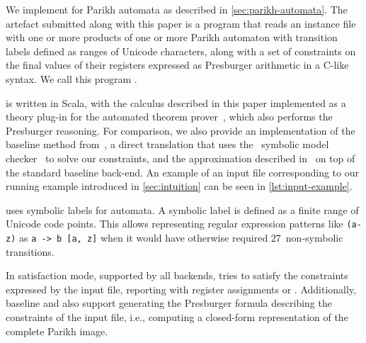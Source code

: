 
We implement \Calculus{} for Parikh automata as described in
\cref{sec:parikh-automata}. The artefact submitted along with this paper is a
program that reads an instance file with one or more products of one or more
Parikh automaton with transition labels defined as ranges of Unicode characters,
along with a set of constraints on the final values of their registers expressed
as Presburger arithmetic in a C-like syntax. We call this program
\Catra.

\Catra{} is written in Scala, with the calculus described in this paper
implemented as a theory plug-in for the \Princess{} automated theorem
prover~\cite{princess}, which also performs the Presburger reasoning. For
comparison, we also provide an implementation of the baseline method
from~\cite{generate-parikh-image}, a direct translation that uses the~\Nuxmv{}
symbolic model checker~\cite{nuxmv} to solve our constraints, and the
approximation described in~\cite{approximate-parikh} on top of the standard
baseline back-end. An example of an input file corresponding to our running
example introduced in \cref{sec:intuition} can be seen in
\cref{lst:input-example}.

\Catra{} uses symbolic labels for automata. A symbolic label is defined as a
finite range of Unicode code points. This allows representing regular expression
patterns like \lstinline{(a-z)} as \lstinline{a -> b [a, z]} when it would have
otherwise required $27$~non-symbolic transitions. 

In satisfaction mode, supported by all backends, \Catra{} tries to satisfy the
constraints expressed by the input file, reporting \Sat{} with register
assignments or \Unsat{}. Additionally, baseline and \Calculus{} also support
generating the Presburger formula describing the constraints of the input file,
i.e., computing a closed-form representation of the complete Parikh image.


